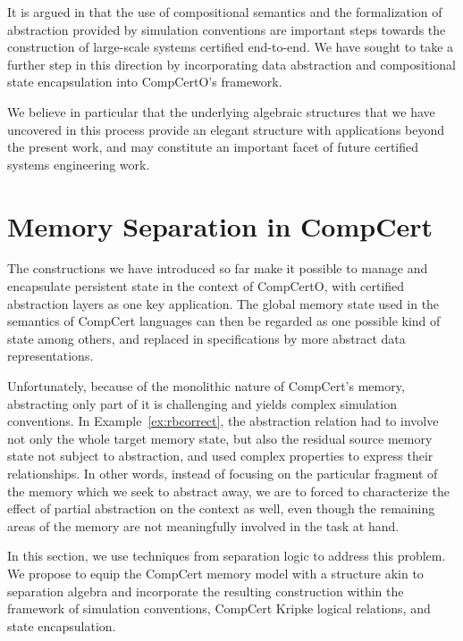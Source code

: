 \documentclass[acmsmall,screen,review,anonymous]{acmart}
\begin{document}
It is argued in \citet{compcerto}
that the use of compositional semantics
and the formalization of abstraction
provided by simulation conventions
are important steps towards
the construction of large-scale systems certified end-to-end.
We have sought to take a further step in this direction
by incorporating data abstraction and
compositional state encapsulation
into CompCertO's framework.

We believe in particular that
the underlying algebraic structures that we have uncovered
in this process
provide an elegant structure
with applications beyond the present work,
and may constitute an important facet of
future certified systems engineering work.




\appendix

\newpage

\section{Memory Separation in CompCert} \label{sec:sep} %

The constructions we have introduced so far
make it possible to manage and encapsulate persistent state
in the context of CompCertO,
with certified abstraction layers
as one key application.
The global memory state used in the semantics of CompCert languages
can then be regarded as one possible kind of state among others,
and replaced in specifications by more abstract data representations.

Unfortunately,
because of the monolithic nature of CompCert's memory,
abstracting only part of it is challenging
and yields complex simulation conventions.
In Example~\ref{ex:rbcorrect},
the abstraction relation had to involve
not only the whole target memory state,
but also the residual source memory state
not subject to abstraction,
and used complex properties to express their relationships.
In other words,
instead of focusing on the particular fragment of the memory
which we seek to abstract away,
we are to forced to characterize the effect of partial abstraction
on the context as well,
even though the remaining areas of the memory
are not meaningfully involved in the task at hand.

In this section,
we use techniques from separation logic
to address this problem.
We propose to equip the CompCert memory model
with a structure akin to separation algebra \cite{something-for-sa}
and incorporate the resulting construction
within the framework of simulation conventions,
CompCert Kripke logical relations,
and state encapsulation.
\end{document}
